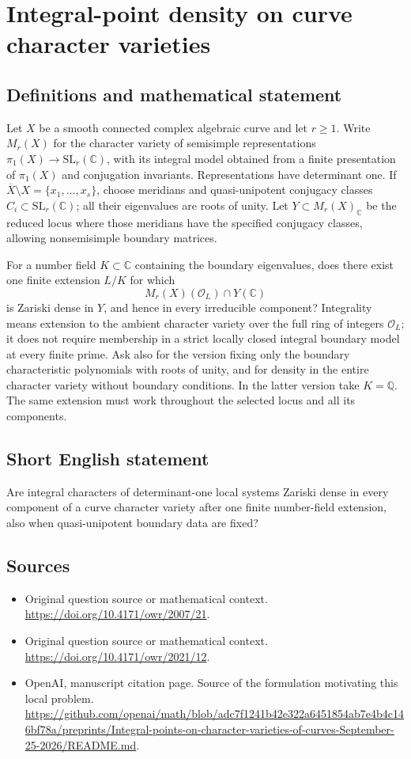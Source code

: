 \documentclass[11pt]{article}
\begin{document}
\section*{Integral-point density on curve character varieties}\label{30007257}
\subsection{Definitions and mathematical statement}
Let $X$ be a smooth connected complex algebraic curve and let $r\ge1$. Write $M_r(X)$ for the character variety of semisimple representations $\pi_1(X)\to\mathrm{SL}_r(\mathbb C)$, with its integral model obtained from a finite presentation of $\pi_1(X)$ and conjugation invariants. Representations have determinant one. If $\overline X\setminus X=\{x_1,\ldots,x_s\}$, choose meridians and quasi-unipotent conjugacy classes $C_i\subset\mathrm{SL}_r(\mathbb C)$; all their eigenvalues are roots of unity. Let $Y\subset M_r(X)_{\mathbb C}$ be the reduced locus where those meridians have the specified conjugacy classes, allowing nonsemisimple boundary matrices.

For a number field $K\subset\mathbb C$ containing the boundary eigenvalues, does there exist one finite extension $L/K$ for which
\[
 M_r(X)(\mathcal O_L)\cap Y(\mathbb C)
\]
is Zariski dense in $Y$, and hence in every irreducible component? Integrality means extension to the ambient character variety over the full ring of integers $\mathcal O_L$; it does not require membership in a strict locally closed integral boundary model at every finite prime. Ask also for the version fixing only the boundary characteristic polynomials with roots of unity, and for density in the entire character variety without boundary conditions. In the latter version take $K=\mathbb Q$. The same extension must work throughout the selected locus and all its components.

\subsection{Short English statement}
Are integral characters of determinant-one local systems Zariski dense in every component of a curve character variety after one finite number-field extension, also when quasi-unipotent boundary data are fixed?

\subsection{Sources}
\begin{itemize}
\item[S1] Original question source or mathematical context.
\url{https://doi.org/10.4171/owr/2007/21}.
\item[S2] Original question source or mathematical context.
\url{https://doi.org/10.4171/owr/2021/12}.
\item[S3] OpenAI, manuscript citation page. Source of the formulation motivating this local problem.
\url{https://github.com/openai/math/blob/adc7f1241b42e322a6451854ab7e4b4c146bf78a/preprints/Integral-points-on-character-varieties-of-curves-September-25-2026/README.md}.
\end{itemize}
\end{document}
